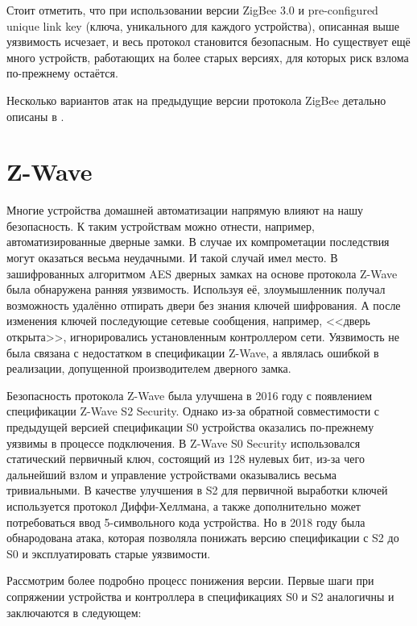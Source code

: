 	Стоит отметить, что при использовании версии ZigBee 3.0 и pre-configured unique link key (ключа,
	уникального для каждого устройства), описанная выше уязвимость исчезает, и весь протокол
	становится безопасным. Но существует ещё много устройств, работающих на более старых версиях,
	для которых риск взлома по-прежнему остаётся.
	
	Несколько вариантов атак на предыдущие версии протокола ZigBee детально описаны в 
	\cite{zigbee-attacks}.


	\section{Z-Wave}
	
	
	Многие устройства домашней автоматизации напрямую влияют на
	нашу безопасность. К таким устройствам можно отнести, например, автоматизированные дверные замки.
	В случае их компрометации последствия могут оказаться весьма неудачными. И такой случай
	имел место. В зашифрованных алгоритмом AES дверных замках на основе протокола Z-Wave была 
	обнаружена ранняя уязвимость. Используя её, злоумышленник получал возможность удалённо отпирать 
	двери без знания ключей шифрования. А после изменения ключей последующие сетевые сообщения, 
	например, <<дверь открыта>>, игнорировались установленным контроллером сети.
	Уязвимость не была связана с недостатком в спецификации Z-Wave, а являлась ошибкой 
	в реализации, допущенной производителем дверного замка.
	
	Безопасность протокола Z-Wave была улучшена в 2016 году с появлением спецификации Z-Wave S2 
	Security. Однако из-за обратной совместимости с предыдущей версией спецификации S0 устройства
	оказались по-прежнему уязвимы в процессе подключения. В Z-Wave S0 Security использовался статический
	первичный ключ, состоящий из 128 нулевых бит, из-за чего дальнейший взлом и управление устройствами 
	оказывались весьма тривиальными. В качестве улучшения в S2 для первичной выработки ключей 
	используется протокол Диффи-Хеллмана, а также дополнительно может потребоваться ввод 5-символьного
	кода устройства. Но в 2018 году была обнародована атака, которая позволяла понижать версию 
	спецификации с S2 до S0 и эксплуатировать старые уязвимости.
	
	
	Рассмотрим более подробно процесс понижения версии. Первые шаги при сопряжении устройства и 
	контроллера в спецификациях S0 и S2 аналогичны и заключаются в следующем:
	

